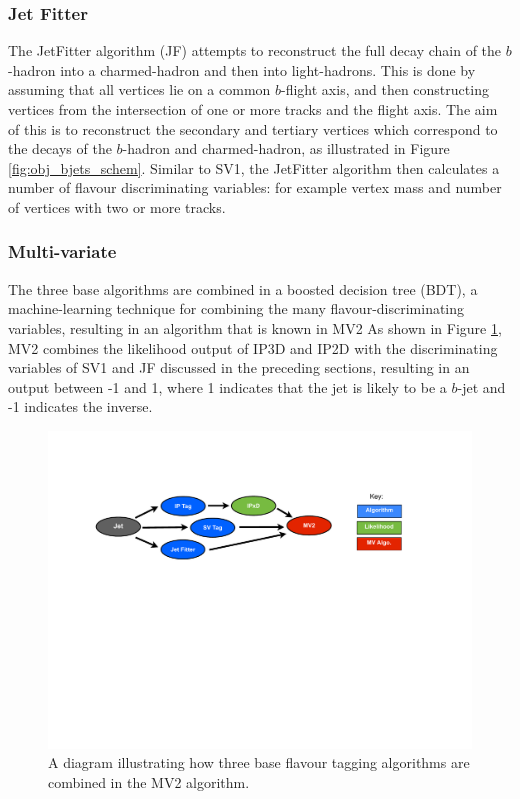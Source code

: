 \subsubsection{Jet Fitter}
\label{sec:obj-bjets_JF}

The JetFitter algorithm (JF) attempts to reconstruct the full decay chain of the $b$-hadron into a charmed-hadron and then into light-hadrons. 
This is done by assuming that all vertices lie on a common $b$-flight axis, and then constructing vertices from the intersection of
one or more tracks and the flight axis.
The aim of this is to reconstruct the secondary and tertiary vertices which correspond to the decays of the $b$-hadron and charmed-hadron,
as illustrated in Figure \ref{fig:obj_bjets_schem}.
Similar to SV1, the JetFitter algorithm then calculates a number of flavour discriminating variables:
for example vertex mass and number of vertices with two or more tracks.

\subsubsection{Multi-variate}
\label{sec:obj-bjets_MV2}

The three base algorithms are combined in a boosted decision tree (BDT), a machine-learning technique for combining the many flavour-discriminating variables,
resulting in an algorithm that is known in MV2
As shown in Figure \ref{fig:obj-MV2_schem}, MV2 combines the likelihood output of IP3D and IP2D
with the discriminating variables of SV1 and JF discussed in the preceding sections,
resulting in an output between -1 and 1, where 1 indicates that the jet is likely to be a $b$-jet and -1 indicates the inverse.

\begin{figure}[!htb]
  \begin{center}
    \includegraphics[width=1.0\textwidth]{figs/Objects/MV2_schem.pdf}
    \caption{A diagram illustrating how three base flavour tagging algorithms are combined in the MV2 algorithm.}
    \label{fig:obj-MV2_schem}
  \end{center}
  \vspace{-1cm}
\end{figure}

